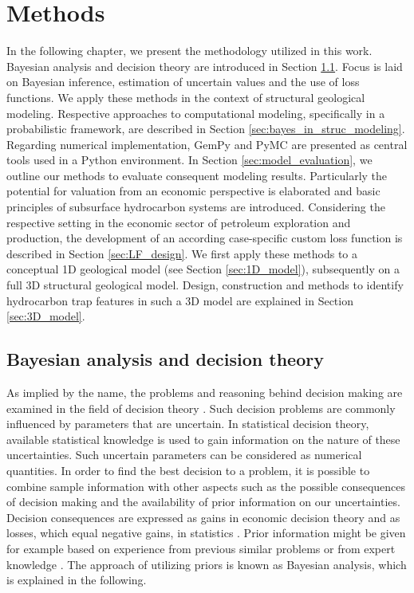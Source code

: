     \chapter{Methods}\label{cha:met}
    In the following chapter, we present the methodology utilized in this work. Bayesian analysis and decision theory are introduced in Section \ref{sec:bayes}. Focus is laid on Bayesian inference, estimation of uncertain values and the use of loss functions. We apply these methods in the context of structural geological modeling. Respective approaches to computational modeling, specifically in a probabilistic framework, are described in Section \ref{sec:bayes_in_struc_modeling}. Regarding numerical implementation, GemPy and PyMC are presented as central tools used in a Python environment. In Section \ref{sec:model_evaluation}, we outline our methods to evaluate consequent modeling results. Particularly the potential for valuation from an economic perspective is elaborated and basic principles of subsurface hydrocarbon systems are introduced. Considering the respective setting in the economic sector of petroleum exploration and production, the development of an according case-specific custom loss function is described in Section \ref{sec:LF_design}. We first apply these methods to a conceptual 1D geological model (see Section \ref{sec:1D_model}), subsequently on a full 3D structural geological model. Design, construction and methods to identify hydrocarbon trap features in such a 3D model are explained in Section \ref{sec:3D_model}.
        
        \section{Bayesian analysis and decision theory}\label{sec:bayes}
	    As implied by the name, the problems and reasoning behind decision making are examined in the field of decision theory \citep{berger2013stat}. Such decision problems are commonly influenced by parameters that are uncertain. In statistical decision theory, available statistical knowledge is used to gain information on the nature of these uncertainties. Such uncertain parameters can be considered as numerical quantities. In order to find the best decision to a problem, it is possible to combine sample information with other aspects such as the possible consequences of decision making and the availability of prior information on our uncertainties. Decision consequences are expressed as gains in economic decision theory and as losses, which equal negative gains, in statistics \citep{berger2013stat}. Prior information might be given for example based on experience from previous similar problems or from expert knowledge \citep{bratvold2010making}. The approach of utilizing priors is known as Bayesian analysis, which is explained in the following. %
	    
